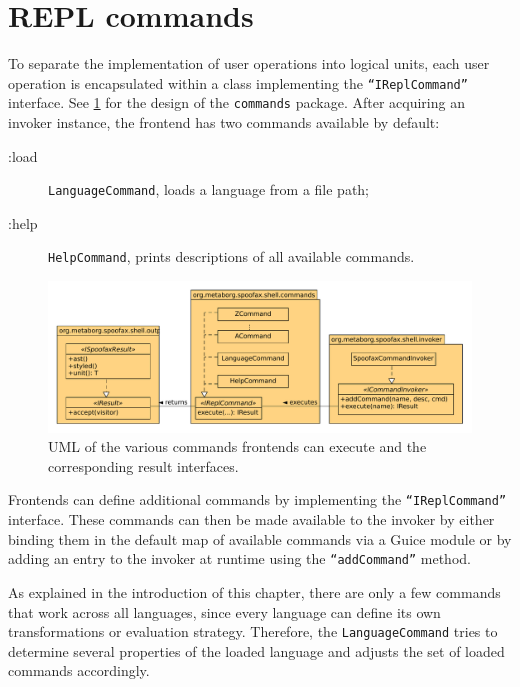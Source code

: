 \section{REPL commands}
\label{sec:commands}

To separate the implementation of user operations into logical units, each user
operation is encapsulated within a class implementing the
\texttt{``IReplCommand''} interface. See \cref{fig:uml-commands} for the design
of the \texttt{commands} package. After acquiring an invoker instance, the
frontend has two commands available by default:

\begin{description}
  \item [:load] \texttt{LanguageCommand}, loads a language from a file path;
  \item [:help] \texttt{HelpCommand}, prints descriptions of all available commands.
\end{description}

\begin{figure}[h]
  \centering
  \includegraphics[width=\textwidth]{uml-commands}
  \caption{UML of the various commands frontends can execute and the
           corresponding result interfaces.}
  \label{fig:uml-commands}
\end{figure}

Frontends can define additional commands by implementing the
\texttt{``IReplCommand''} interface. These commands can then be made available
to the invoker by either binding them in the default map of available commands
via a Guice module or by adding an entry to the invoker at runtime using the
\texttt{``addCommand''} method.

As explained in the introduction of this chapter, there are only a few
commands that work across all languages, since every language can define its
own transformations or evaluation strategy. Therefore, the
\texttt{LanguageCommand} tries to determine several properties of the loaded
language and adjusts the set of loaded commands accordingly.

